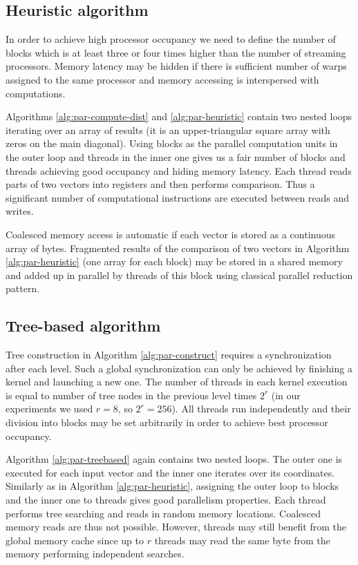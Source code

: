 \documentclass[a4paper]{article}
\begin{document}
\subsection{Heuristic algorithm}

In order to achieve high processor occupancy we need to define the number of blocks which is at least three or four times higher than the number of streaming processors. Memory latency may be hidden if there is sufficient number of warps assigned to the same processor and memory accessing is interspersed with computations. 

Algorithms \ref{alg:par-compute-dist} and \ref{alg:par-heuristic} contain two nested loops iterating over an array of results (it is an upper-triangular square array with zeros on the main diagonal). Using blocks as the parallel computation units in the outer loop and threads in the inner one gives us a fair number of blocks and threads achieving good occupancy and hiding memory latency. Each thread reads parts of two vectors into registers and then performs comparison. Thus a significant number of computational instructions are executed between reads and writes. 

Coalesced memory access is automatic if each vector is stored as a continuous array of bytes. 
Fragmented results of the comparison of two vectors in Algorithm \ref{alg:par-heuristic} (one array for each block) may be stored in a shared memory and added up in parallel by threads of this block using classical parallel reduction pattern.

\subsection{Tree-based algorithm}

Tree construction in Algorithm \ref{alg:par-construct} requires a synchronization after each level. Such a global synchronization can only be achieved by finishing a kernel and launching a new one. 
The number of threads in each kernel execution is equal to number of tree nodes in the previous level times $2^r$ (in our experiments we used $r=8$, so $2^r = 256$). All threads run independently and their division into blocks may be set arbitrarily in order to achieve best processor occupancy.

Algorithm \ref{alg:par-treebased} again contains two nested loops. The outer one is executed for each input vector and the inner one iterates over its coordinates. Similarly as in Algorithm \ref{alg:par-heuristic}, assigning the outer loop to blocks and the inner one to threads gives good parallelism properties. Each thread performs tree searching and reads in random memory locations. Coalesced memory reads are thus not possible. However, threads may still benefit from the global memory cache since up to $r$ threads may read the same byte from the memory performing independent searches. 
\end{document}
